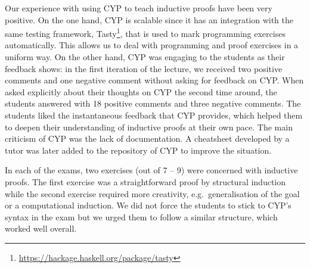 Our experience with using CYP to teach inductive proofs have been very positive.
On the one hand, CYP is scalable since it has an integration with the same testing framework, Tasty\footnote{\url{https://hackage.haskell.org/package/tasty}}, that is used to mark programming exercises automatically.
This allows us to deal with programming and proof exercises in a uniform way.
On the other hand, CYP was engaging to the students as their feedback shows:
in the first iteration of the lecture, we received two positive comments and one negative comment without asking for feedback on CYP.
When asked explicitly about their thoughts on CYP the second time around, the students answered with 18 positive comments and three negative comments.
The students liked the instantaneous feedback that CYP provides, which helped them to deepen their understanding of inductive proofs at their own pace.
The main criticism of CYP was the lack of documentation.
A cheatsheet developed by a tutor was later added to the repository of CYP to improve the situation.

In each of the exams, two exercises (out of 7 -- 9) were concerned with inductive proofs.
The first exercise was a straightforward proof by structural induction while the second exercise required more creativity, e.g.\ generalisation of the goal or a computational induction.
We did not force the students to stick to CYP's syntax in the exam but we urged them to follow a similar structure, which worked well overall.

